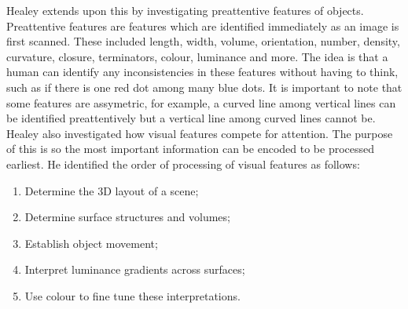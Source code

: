 			Healey extends upon this by investigating preattentive features of objects\cite{attention_visualizaton_healey}. Preattentive features are features which are identified immediately as an image is first scanned. These included length, width, volume, orientation, number, density, curvature, closure, terminators, colour, luminance and more. The idea is that a human can identify any inconsistencies in these features without having to think, such as if there is one red dot among many blue dots. It is important to note that some features are assymetric, for example, a curved line among vertical lines can be identified preattentively but a vertical line among curved lines cannot be. Healey also investigated how visual features compete for attention. The purpose of this is so the most important information can be encoded to be processed earliest. He identified the order of processing of visual features as follows:
			
			\begin{enumerate}
				\item Determine the 3D layout of a scene;
				\item Determine surface structures and volumes;
				\item Establish object movement;
				\item Interpret luminance gradients across surfaces;
				\item Use colour to fine tune these interpretations.
			\end{enumerate}
		
